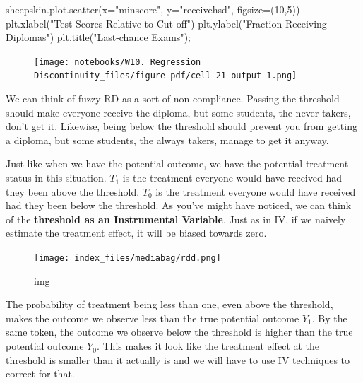 \documentclass[
  letterpaper,
  DIV=11,
  numbers=noendperiod]{scrreprt}
\newenvironment{Shaded}{\begin{snugshade}}{\end{snugshade}}
\newcommand{\DecValTok}[1]{\textcolor[rgb]{0.68,0.00,0.00}{#1}}
\newcommand{\NormalTok}[1]{\textcolor[rgb]{0.00,0.23,0.31}{#1}}
\newcommand{\OperatorTok}[1]{\textcolor[rgb]{0.37,0.37,0.37}{#1}}
\newcommand{\StringTok}[1]{\textcolor[rgb]{0.13,0.47,0.30}{#1}}
\begin{document}
\begin{Shaded}
\begin{Highlighting}[]
\NormalTok{sheepskin.plot.scatter(x}\OperatorTok{=}\StringTok{"minscore"}\NormalTok{, y}\OperatorTok{=}\StringTok{"receivehsd"}\NormalTok{, figsize}\OperatorTok{=}\NormalTok{(}\DecValTok{10}\NormalTok{,}\DecValTok{5}\NormalTok{))}
\NormalTok{plt.xlabel(}\StringTok{"Test Scores Relative to Cut off"}\NormalTok{)}
\NormalTok{plt.ylabel(}\StringTok{"Fraction Receiving Diplomas"}\NormalTok{)}
\NormalTok{plt.title(}\StringTok{"Last{-}chance Exams"}\NormalTok{)}\OperatorTok{;}
\end{Highlighting}
\end{Shaded}

\begin{figure}[H]

{\centering \texttt{[image: notebooks/W10. Regression Discontinuity\_files/figure-pdf/cell-21-output-1.png]}

}

\end{figure}

We can think of fuzzy RD as a sort of non compliance. Passing the
threshold should make everyone receive the diploma, but some students,
the never takers, don't get it. Likewise, being below the threshold
should prevent you from getting a diploma, but some students, the always
takers, manage to get it anyway.

Just like when we have the potential outcome, we have the potential
treatment status in this situation. \(T_1\) is the treatment everyone
would have received had they been above the threshold. \(T_0\) is the
treatment everyone would have received had they been below the
threshold. As you've might have noticed, we can think of the
\textbf{threshold as an Instrumental Variable}. Just as in IV, if we
naively estimate the treatment effect, it will be biased towards zero.

\begin{figure}

{\centering \texttt{[image: index\_files/mediabag/rdd.png]}

}

\caption{img}

\end{figure}

The probability of treatment being less than one, even above the
threshold, makes the outcome we observe less than the true potential
outcome \(Y_1\). By the same token, the outcome we observe below the
threshold is higher than the true potential outcome \(Y_0\). This makes
it look like the treatment effect at the threshold is smaller than it
actually is and we will have to use IV techniques to correct for that.
\end{document}
